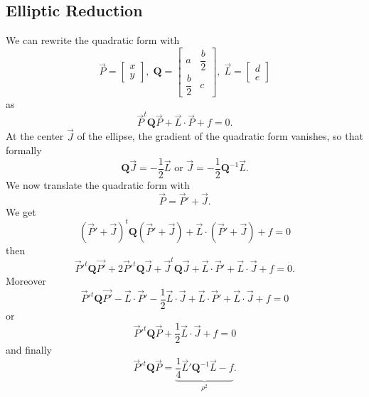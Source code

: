 \documentclass[aps]{revtex4}
\begin{document}
\subsection{Elliptic Reduction}
We can rewrite the quadratic form with
\begin{equation}
	\vec{P} = \begin{bmatrix}
		x\\
		y
		\end{bmatrix},
		\;
		\bm{Q} = \begin{bmatrix}
		a & \dfrac{b}{2}\\
		\dfrac{b}{2} & c
		\end{bmatrix},\;
		\vec{L} = \begin{bmatrix}
		d\\
		e
		\end{bmatrix}
\end{equation}
as
\begin{equation}
	\vec{P}^t \bm{Q} \vec{P} + \vec{L}\cdot\vec{P} + f = 0.
\end{equation}
At the center $\vec{J}$ of the ellipse, the gradient of the quadratic form 
vanishes, so that formally
\begin{equation}
	\bm{Q}\vec{J} = -\dfrac{1}{2}\vec{L}\text{ or }\vec{J} = -\dfrac{1}{2} \bm{Q}^{-1} \vec{L}.
\end{equation}
We now translate the quadratic form with
\begin{equation}
	\vec{P} = \vec{P}' + \vec{J}.
\end{equation}
We get
\begin{equation}
	\left(\vec{P}' + \vec{J}\right)^t \bm{Q} \left(\vec{P}' + \vec{J}\right) +
	\vec{L}\cdot\left(\vec{P}' + \vec{J}\right) + f = 0
\end{equation}
then
\begin{equation}
	\vec{P}'^t \bm{Q} \vec{P'} + 2 \vec{P}'^t \bm{Q} \vec{J} + \vec{J}^t \bm{Q} \vec{J} + 
	\vec{L}\cdot\vec{P}' + \vec{L}\cdot\vec{J} + f = 0.
\end{equation}
Moreover
\begin{equation}
	\vec{P}'^t \bm{Q} \vec{P'} - \vec{L}\cdot\vec{P}' - \dfrac{1}{2} \vec{L}\cdot\vec{J} +
    \vec{L}\cdot\vec{P}' + \vec{L}\cdot\vec{J} + f = 0
\end{equation}
or
\begin{equation}
	\vec{P}'^t \bm{Q} \vec{P} + \dfrac{1}{2} \vec{L}\cdot\vec{J} + f = 0
\end{equation}
and finally
\begin{equation}
	\vec{P}'^t \bm{Q} \vec{P} = \underbrace{\dfrac{1}{4} \vec{L}' \bm{Q}^{-1} \vec{L} -f}_{\rho^2}.
\end{equation}
\end{document}
